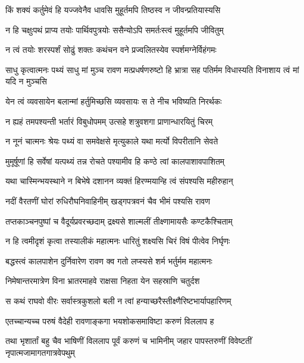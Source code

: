 \twolineshloka
{किं शक्यं कर्तुमेवं हि यज्जवेनैव धावसि}
{मुहूर्तमपि तिष्ठस्व न जीवन्प्रतियास्यसि} %

\twolineshloka
{न हि चक्षुःपथं प्राप्य तयोः पार्थिवपुत्रयोः}
{ससैन्योऽपि समर्तःस्त्वं मुहूर्तमपि जीवितुम्} %

\twolineshloka
{न त्वं तयोः शरस्पर्शं सोढुं शक्तः कथंचन}
{वने प्रज्वलितस्येव स्पर्शमग्नेर्विहंगमः} %

\threelineshloka
{साधु कृत्वात्मनः पथ्यं साधु मां मुञ्च रावण}
{मत्प्रधर्षणरुष्टो हि भ्रात्रा सह पतिर्मम}
{विधास्यति विनाशाय त्वं मां यदि न मुञ्चसि} %

\twolineshloka
{येन त्वं व्यवसायेन बलान्मां हर्तुमिच्छसि}
{व्यवसायः स ते नीच भविष्यति निरर्थकः} %

\twolineshloka
{न ह्यहं तमपश्यन्ती भर्तारं विबुधोपमम्}
{उत्सहे शत्रुवशगा प्राणान्धारयितुं चिरम्} %

\twolineshloka
{न नूनं चात्मनः श्रेयः पथ्यं वा समवेक्षसे}
{मृत्युकाले यथा मर्त्यो विपरीतानि सेवते} %

\twolineshloka
{मुमूर्षूणां हि सर्वेषां यत्पथ्यं तन्न रोचते}
{पश्यामीव हि कण्ठे त्वां कालपाशावपाशितम्} %

\twolineshloka
{यथा चास्मिन्भयस्थाने न बिभेषे दशानन}
{व्यक्तं हिरण्मयान्हि त्वं संपश्यसि महीरुहान्} %

\twolineshloka
{नदीं वैरतणीं घोरां रुधिरौघनिवाहिनीम्}
{खड्गपत्रवनं चैव भीमं पश्यसि रावण} %

\twolineshloka
{तप्तकाञ्चनपुष्पां च वैदूर्यप्रवरच्छदाम्}
{द्रक्ष्यसे शाल्मलीं तीक्ष्णामायसैः कण्टकैश्चिताम्} %

\twolineshloka
{न हि त्वमीदृशं कृत्वा तस्यालीकं महात्मनः}
{धारितुं शक्ष्यसि चिरं विषं पीत्वेव निर्घृणः} %

\twolineshloka
{बद्धस्त्वं कालपाशेन दुर्निवारेण रावण}
{क्व गतो लप्स्यसे शर्म भर्तुर्मम महात्मनः} %

\twolineshloka
{निमेषान्तरमात्रेण विना भ्रातरमाहवे}
{राक्षसा निहता येन सहस्राणि चतुर्दश} %

\twolineshloka
{स कथं राघवो वीरः सर्वास्त्रकुशलो बली}
{न त्वां हन्याच्छरैस्तीक्ष्णैरिष्टभार्यापहारिणम्} %

\twolineshloka
{एतच्चान्यच्च परुषं वैदेही रावणाङ्कगा}
{भयशोकसमाविष्टा करुणं विललाप ह} %

\fourlineindentedshloka
{तथा भृशार्तां बहु चैव भाषिणीं}
{ विललाप पूर्वं करुणं च भामिनीम्}
{जहार पापस्तरुणीं विवेष्टतीं}
{ नृपात्मजामागतगात्रवेपथुम्} %


